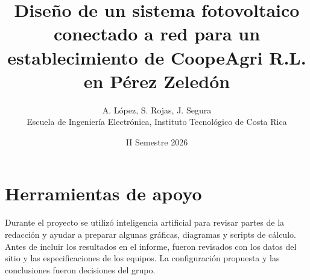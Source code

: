 \documentclass[10pt,letterpaper]{article}
\begin{document}
\title{Diseño de un sistema fotovoltaico conectado a red para un establecimiento de CoopeAgri R.L. en Pérez Zeledón}
\author{A. López, S. Rojas, J. Segura\\[2pt]
\small Escuela de Ingeniería Electrónica, Instituto Tecnológico de Costa Rica}
\date{II Semestre 2026}
\thispagestyle{fancy}
\maketitle
\thispagestyle{fancy}












\section*{Herramientas de apoyo}

Durante el proyecto se utilizó inteligencia artificial para revisar partes de la redacción y ayudar a preparar algunas gráficas, diagramas y scripts de cálculo. Antes de incluir los resultados en el informe, fueron revisados con los datos del sitio y las especificaciones de los equipos. La configuración propuesta y las conclusiones fueron decisiones del grupo.
\end{document}
